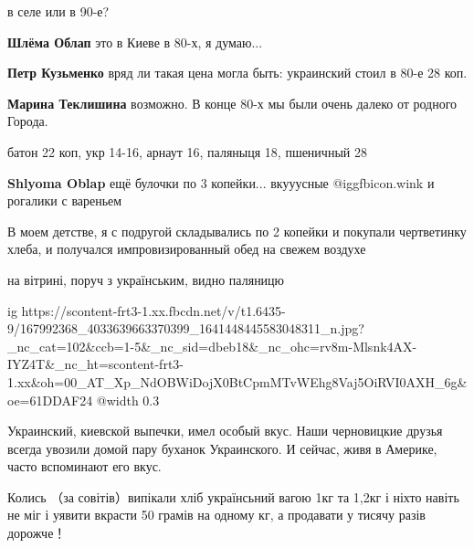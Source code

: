  
 
 
 
 

в селе или в 90-е?

\textbf{Шлёма Облап} это в Киеве в 80-х, я думаю...

\textbf{Петр Кузьменко} вряд ли такая цена могла быть: украинский стоил в 80-е 28 коп.

\textbf{Марина Теклишина} возможно. В конце 80-х мы были очень далеко от родного Города.

батон 22 коп, укр 14-16, арнаут 16, паляныця 18, пшеничный 28

\textbf{Shlyoma Oblap} ещё булочки по 3 копейки... вкууусные  @igg{fbicon.wink}  и рогалики с вареньем


В моем детстве, я с подругой складывались по 2 копейки и покупали чертветинку
хлеба, и получался импровизированный обед на свежем воздухе

на вітрині, поруч з українським, видно паляницю

\ifcmt
  ig https://scontent-frt3-1.xx.fbcdn.net/v/t1.6435-9/167992368_4033639663370399_1641448445583048311_n.jpg?_nc_cat=102&ccb=1-5&_nc_sid=dbeb18&_nc_ohc=rv8m-Mlsnk4AX-IYZ4T&_nc_ht=scontent-frt3-1.xx&oh=00_AT_Xp_NdOBWiDojX0BtCpmMTvWEhg8Vaj5OiRVI0AXH_6g&oe=61DDAF24
  @width 0.3
\fi


Украинский, киевской выпечки, имел особый вкус. Наши черновицкие друзья всегда
увозили домой пару буханок Украинского. И сейчас, живя в Америке, часто
вспоминают его вкус.


Колись （за совітів）випікали хліб українсьний вагою 1кг та 1,2кг і ніхто
навіть не міг і уявити вкрасти 50 грамів на одному кг, а продавати у тисячу
разів дорожче！

